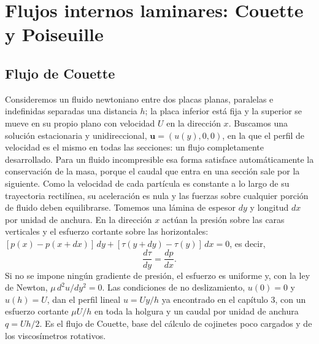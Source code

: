 \documentclass[10pt,openany]{book}
\begin{document}
\chapter{Flujos internos laminares: Couette y Poiseuille}
\label{chap:c06}


\section{Flujo de Couette}

Consideremos un fluido newtoniano entre dos placas planas, paralelas e indefinidas separadas una distancia \(h\); la placa inferior está fija y la superior se mueve en su propio plano con velocidad \(U\) en la dirección \(x\). Buscamos una solución estacionaria y unidireccional, \(\mathbf{u} = (u(y), 0, 0)\), en la que el perfil de velocidad es el mismo en todas las secciones: un flujo completamente desarrollado. Para un fluido incompresible esa forma satisface automáticamente la conservación de la masa, porque el caudal que entra en una sección sale por la siguiente. Como la velocidad de cada partícula es constante a lo largo de su trayectoria rectilínea, su aceleración es nula y las fuerzas sobre cualquier porción de fluido deben equilibrarse. Tomemos una lámina de espesor \(dy\) y longitud \(dx\) por unidad de anchura. En la dirección \(x\) actúan la presión sobre las caras verticales y el esfuerzo cortante sobre las horizontales: \([p(x) - p(x + dx)]\,dy + [\tau(y + dy) - \tau(y)]\,dx = 0\), es decir,
\begin{equation}
\frac{d\tau}{dy} = \frac{dp}{dx}. \label{eq:c06-balance}
\end{equation}
Si no se impone ningún gradiente de presión, el esfuerzo es uniforme y, con la ley de Newton, \(\mu\,d^{2}u/dy^{2} = 0\). Las condiciones de no deslizamiento, \(u(0) = 0\) y \(u(h) = U\), dan el perfil lineal \(u = Uy/h\) ya encontrado en el capítulo 3, con un esfuerzo cortante \(\mu U/h\) en toda la holgura y un caudal por unidad de anchura \(q = Uh/2\). Es el flujo de Couette, base del cálculo de cojinetes poco cargados y de los viscosímetros rotativos.
\end{document}
